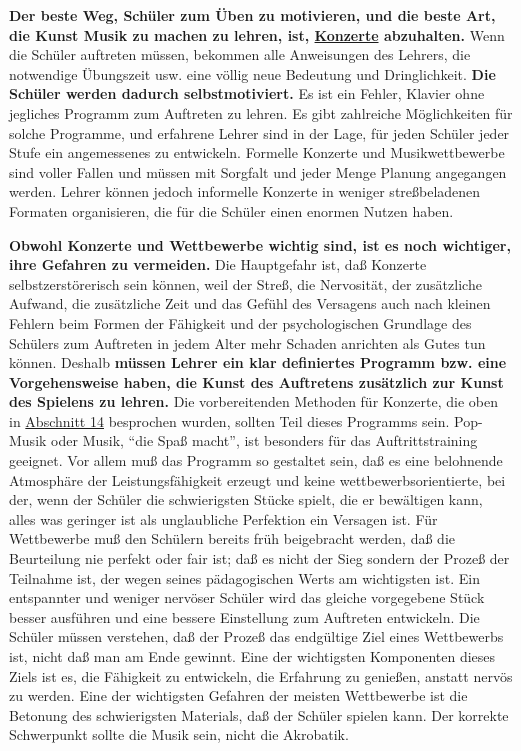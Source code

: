 \textbf{Der beste Weg, Schüler zum Üben zu motivieren, und die beste Art, die Kunst Musik zu machen zu lehren, ist, \hyperref[c1iii14]{Konzerte} abzuhalten.}
Wenn die Schüler auftreten müssen, bekommen alle Anweisungen des Lehrers, die notwendige Übungszeit usw. eine völlig neue Bedeutung und Dringlichkeit.
\textbf{Die Schüler werden dadurch selbstmotiviert.}
Es ist ein Fehler, Klavier ohne jegliches Programm zum Auftreten zu lehren.
Es gibt zahlreiche Möglichkeiten für solche Programme, und erfahrene Lehrer sind in der Lage, für jeden Schüler jeder Stufe ein angemessenes zu entwickeln.
Formelle Konzerte und Musikwettbewerbe sind voller Fallen und müssen mit Sorgfalt und jeder Menge Planung angegangen werden.
Lehrer können jedoch informelle Konzerte in weniger streßbeladenen Formaten organisieren, die für die Schüler einen enormen Nutzen haben.

\textbf{Obwohl Konzerte und Wettbewerbe wichtig sind, ist es noch wichtiger, ihre Gefahren zu vermeiden.}
Die Hauptgefahr ist, daß Konzerte selbstzerstörerisch sein können, weil der Streß, die Nervosität, der zusätzliche Aufwand, die zusätzliche Zeit und das Gefühl des Versagens auch nach kleinen Fehlern beim Formen der Fähigkeit und der psychologischen Grundlage des Schülers zum Auftreten in jedem Alter mehr Schaden anrichten als Gutes tun können.
Deshalb \textbf{müssen Lehrer ein klar definiertes Programm bzw. eine Vorgehensweise haben, die Kunst des Auftretens zusätzlich zur Kunst des Spielens zu lehren.}
Die vorbereitenden Methoden für Konzerte, die oben in \hyperref[c1iii14]{Abschnitt 14} besprochen wurden, sollten Teil dieses Programms sein.
Pop-Musik oder Musik, \enquote{die Spaß macht}, ist besonders für das Auftrittstraining geeignet.
Vor allem muß das Programm so gestaltet sein, daß es eine belohnende Atmosphäre der Leistungsfähigkeit erzeugt und keine wettbewerbsorientierte, bei der, wenn der Schüler die schwierigsten Stücke spielt, die er bewältigen kann, alles was geringer ist als unglaubliche Perfektion ein Versagen ist.
Für Wettbewerbe muß den Schülern bereits früh beigebracht werden, daß die Beurteilung nie perfekt oder fair ist; daß es nicht der Sieg sondern der Prozeß der Teilnahme ist, der wegen seines pädagogischen Werts am wichtigsten ist.
Ein entspannter und weniger nervöser Schüler wird das gleiche vorgegebene Stück besser ausführen und eine bessere Einstellung zum Auftreten entwickeln.
Die Schüler müssen verstehen, daß der Prozeß das endgültige Ziel eines Wettbewerbs ist, nicht daß man am Ende gewinnt.
Eine der wichtigsten Komponenten dieses Ziels ist es, die Fähigkeit zu entwickeln, die Erfahrung zu genießen, anstatt nervös zu werden.
Eine der wichtigsten Gefahren der meisten Wettbewerbe ist die Betonung des schwierigsten Materials, daß der Schüler spielen kann.
Der korrekte Schwerpunkt sollte die Musik sein, nicht die Akrobatik.

